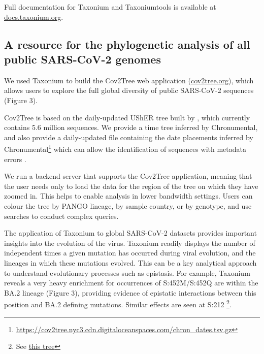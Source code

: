 Full documentation for Taxonium and Taxoniumtools is available at \href{http://docs.taxonium.org}{docs.taxonium.org}.

\subsection*{A resource for the phylogenetic analysis of all public SARS-CoV-2 genomes}

We used Taxonium to build the Cov2Tree web application (\href{http://cov2tree.org}{cov2tree.org}), which allows users to explore the full global diversity of public SARS-CoV-2 sequences (Figure 3). 

Cov2Tree is based on the daily-updated UShER tree built by \cite{McBroome2021}, which currently contains 5.6 million sequences. We provide a time tree inferred by Chronumental, and also provide a daily-updated file containing the date placements inferred by Chronumental\footnote{\url{https://cov2tree.nyc3.cdn.digitaloceanspaces.com/chron_dates.tsv.gz}} which can allow the identification of sequences with metadata errors \citep{chronumental}.

We run a backend server that supports the Cov2Tree application, meaning that the user needs only to load the data for the region of the tree on which they have zoomed in. This helps to enable analysis in lower bandwidth settings. Users can colour the tree by PANGO lineage, by sample country, or by genotype, and use searches to conduct complex queries.

The application of Taxonium to global SARS-CoV-2 datasets provides important insights into the evolution of the virus. Taxonium readily displays the number of independent times a given mutation has occurred during viral evolution, and the lineages in which these mutations evolved. This can be a key analytical approach to understand evolutionary processes such as epistasis. For example, Taxonium reveals a very heavy enrichment for occurrences of S:452M/S:452Q are within the BA.2 lineage (Figure 3), providing evidence of epistatic interactions between this position and BA.2 defining mutations. Similar effects are seen at S:212 \footnote{See \href{https://cov2tree.org/?srch=\%5B\%7B\%22key\%22\%3A\%22aa1\%22\%2C\%22type\%22\%3A\%22mutation\%22\%2C\%22method\%22\%3A\%22mutation\%22\%2C\%22text\%22\%3A\%22\%22\%2C\%22gene\%22\%3A\%22S\%22\%2C\%22position\%22\%3A\%22212\%22\%2C\%22new_residue\%22\%3A\%22any\%22\%2C\%22min_tips\%22\%3A\%2210\%22\%7D\%5D&color=\%7B\%22field\%22\%3A\%22None\%22\%7D}{this tree}}.

